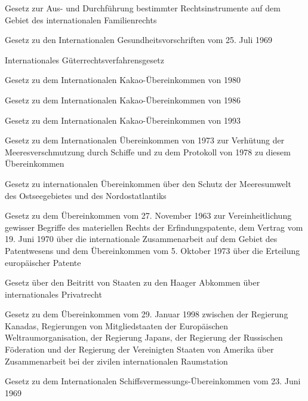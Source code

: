 \item[{IntFamRVG}] Gesetz zur Aus- und Durchführung bestimmter Rechtsinstrumente auf dem Gebiet des internationalen Familienrechts

\item[{IntGesVsG}] Gesetz zu den Internationalen Gesundheitsvorschriften vom 25. Juli 1969

\item[{IntGüRVG}] Internationales Güterrechtsverfahrensgesetz

\item[{IntKakaoÜbk1980G}] Gesetz zu dem Internationalen Kakao-Übereinkommen von 1980

\item[{IntKakaoÜbk1986G}] Gesetz zu dem Internationalen Kakao-Übereinkommen von 1986

\item[{IntKakaoÜbk1993G}] Gesetz zu dem Internationalen Kakao-Übereinkommen von 1993

\item[{IntMeerSchÜbk1973G}] Gesetz zu dem Internationalen Übereinkommen von 1973 zur Verhütung der Meeresverschmutzung durch Schiffe und zu dem Protokoll von 1978 zu diesem Übereinkommen

\item[{IntMUSchÜbkG}] Gesetz zu internationalen Übereinkommen über den Schutz der Meeresumwelt des Ostseegebietes und des Nordostatlantiks

\item[{IntPatÜbkG}] Gesetz zu dem Übereinkommen vom 27. November 1963 zur Vereinheitlichung gewisser Begriffe des materiellen Rechts der Erfindungspatente, dem Vertrag vom 19. Juni 1970 über die internationale Zusammenarbeit auf dem Gebiet des Patentwesens und dem Übereinkommen vom 5. Oktober 1973 über die Erteilung europäischer Patente

\item[{IntPRAbkG-Haag}] Gesetz über den Beitritt von Staaten zu den Haager Abkommen über internationales Privatrecht

\item[{IntRaumsÜbkG}] Gesetz zu dem Übereinkommen vom 29. Januar 1998 zwischen der Regierung Kanadas, Regierungen von Mitgliedstaaten der Europäischen Weltraumorganisation, der Regierung Japans, der Regierung der Russischen Föderation und der Regierung der Vereinigten Staaten von Amerika über Zusammenarbeit bei der zivilen internationalen Raumstation

\item[{IntSchVermÜbkG}] Gesetz zu dem Internationalen Schiffsvermessungs-Übereinkommen vom 23. Juni 1969


